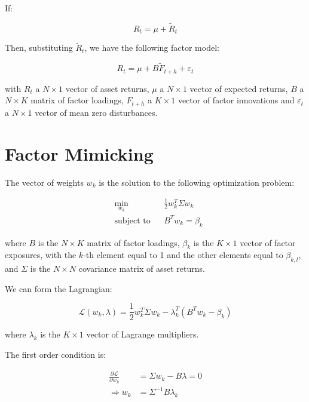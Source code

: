 If:

\begin{equation}
    R_t = \mu + \tilde{R}_t
\end{equation}

Then, substituting $\tilde{R}_t$, we have the following factor model:

\begin{equation}
    R_t = \mu + B \tilde{F}_{t+h} + \varepsilon_t
\end{equation}

with $R_t$ a $N \times 1$ vector of 
asset returns, $\mu$ a $N \times 1$ vector
of expected returns, $B$ a $N \times K$ matrix
of factor loadings, $F_{t+h}$ a $K \times 1$ vector
of factor innovations and $\varepsilon_t$ a $N \times 1$
vector of mean zero disturbances.



\section{Factor Mimicking}

The vector of weights $w_k$ 
is the solution to the following optimization problem:

\begin{equation}
    \begin{aligned}
        & \underset{w_k}{\min}
        & &  \frac{1}{2} w_k^T \Sigma w_k \\
        & \text{subject to}
        & & B^T w_k = \beta_k
    \end{aligned}
\end{equation}

where $B$ is the $N \times K$ matrix of factor loadings, $\beta_k$ is the $K \times 1$ vector of factor exposures,
with the $k$-th element equal to 1 and the other elements equal to $\beta_{k,l}$, 
and $\Sigma$ is the $N \times N$ covariance matrix of asset returns.

We can form the Lagrangian:

\begin{equation}
    \mathcal{L}(w_k, \lambda) = \frac{1}{2} w_k^T \Sigma w_k - \lambda_k^T (B^T w_k - \beta_k)
\end{equation}

where $\lambda_k$ is the $K \times 1$ vector of Lagrange multipliers.

The first order condition is:

\begin{equation}
    \begin{aligned}
        \frac{\partial \mathcal{L}}{\partial w_k} &= \Sigma w_k - B \lambda = 0 \\
        \Rightarrow w_k &= \Sigma^{-1} B \lambda_k
    \end{aligned}
\end{equation}

